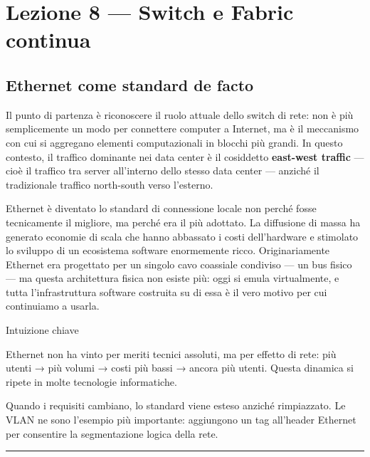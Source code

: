 \documentclass[
  italian,
  openany]{book}
\begin{document}
\newpage

\chapter{Lezione 8 --- Switch e Fabric
continua}\label{lezione-8-switch-e-fabric-continua}

\section{Ethernet come standard de
facto}\label{ethernet-come-standard-de-facto}

Il punto di partenza è riconoscere il ruolo attuale dello switch di
rete: non è più semplicemente un modo per connettere computer a
Internet, ma è il meccanismo con cui si aggregano elementi
computazionali in blocchi più grandi. In questo contesto, il traffico
dominante nei data center è il cosiddetto \textbf{east-west traffic} ---
cioè il traffico tra server all'interno dello stesso data center ---
anziché il tradizionale traffico north-south verso l'esterno.

Ethernet è diventato lo standard di connessione locale non perché fosse
tecnicamente il migliore, ma perché era il più adottato. La diffusione
di massa ha generato economie di scala che hanno abbassato i costi
dell'hardware e stimolato lo sviluppo di un ecosistema software
enormemente ricco. Originariamente Ethernet era progettato per un
singolo cavo coassiale condiviso --- un bus fisico --- ma questa
architettura fisica non esiste più: oggi si emula virtualmente, e tutta
l'infrastruttura software costruita su di essa è il vero motivo per cui
continuiamo a usarla.

\begin{callouttip}{Intuizione chiave}

Ethernet non ha vinto per meriti tecnici assoluti, ma per effetto di
rete: più utenti → più volumi → costi più bassi → ancora più utenti.
Questa dinamica si ripete in molte tecnologie informatiche.

\end{callouttip}

Quando i requisiti cambiano, lo standard viene esteso anziché
rimpiazzato. Le VLAN ne sono l'esempio più importante: aggiungono un tag
all'header Ethernet per consentire la segmentazione logica della rete.

\begin{center}\rule{0.5\linewidth}{0.5pt}\end{center}
\end{document}

